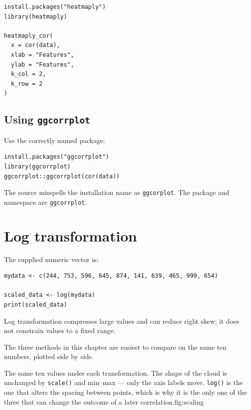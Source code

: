 \begin{lstlisting}[style=dsr]
install.packages("heatmaply")
library(heatmaply)

heatmaply_cor(
  x = cor(data),
  xlab = "Features",
  ylab = "Features",
  k_col = 2,
  k_row = 2
)
\end{lstlisting}

\subsection{Using \texttt{ggcorrplot}}

Use the correctly named package:

\begin{lstlisting}[style=dsr]
install.packages("ggcorrplot")
library(ggcorrplot)
ggcorrplot::ggcorrplot(cor(data))
\end{lstlisting}

\begin{pitfall}
The source misspells the installation name as \texttt{ggcorplot}. The package and namespace are \texttt{ggcorrplot}.
\end{pitfall}

\section{Log transformation}

The supplied numeric vector is:

\begin{lstlisting}[style=dsr]
mydata <- c(244, 753, 596, 645, 874, 141, 639, 465, 999, 654)

scaled_data <- log(mydata)
print(scaled_data)
\end{lstlisting}

Log transformation compresses large values and can reduce right skew; it does not constrain values to a fixed range.

The three methods in this chapter are easiest to compare on the same ten
numbers, plotted side by side.

\begin{utpfig}{The same ten values under each
transformation. The shape of the cloud is unchanged by \texttt{scale()} and
min--max --- only the axis labels move. \texttt{log()} is the one that alters
the spacing between points, which is why it is the only one of the three that
can change the outcome of a later correlation.}{fig:scaling}

\end{utpfig}

